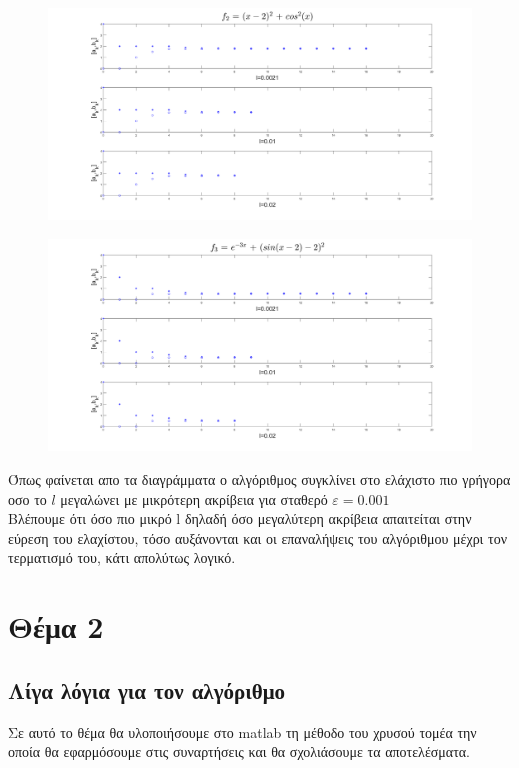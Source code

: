 \documentclass{article}
\begin{document}
\begin{figure}[h!]	
     \centering
     \advance\leftskip-2.45cm 
  \includegraphics[width=160mm,scale=2]{t3b.png}
\end{figure}
\clearpage
\begin{figure}[h!]	
     \centering
     \advance\leftskip-2.45cm 
  \includegraphics[width=170mm,scale=2]{t3c.png}
\end{figure}
Όπως φαίνεται απο τα διαγράμματα ο αλγόριθμος συγκλίνει στο ελάχιστο πιο γρήγορα οσο το $l$ μεγαλώνει με μικρότερη ακρίβεια για σταθερό $ε=0.001$ \\ 
Βλέπουμε ότι όσο πιο μικρό l δηλαδή όσο μεγαλύτερη ακρίβεια απαιτείται στην εύρεση του
ελαχίστου, τόσο αυξάνονται και οι επαναλήψεις του αλγόριθμου μέχρι τον τερματισμό του, κάτι
απολύτως λογικό.
\newpage
\section*{Θέμα 2}
\subsection*{Λίγα λόγια για τον αλγόριθμο} 
Σε αυτό το θέμα θα υλοποιήσουμε στο matlab τη μέθοδο του χρυσού τομέα την οποία θα εφαρμόσουμε στις συναρτήσεις και θα σχολιάσουμε τα αποτελέσματα.
\end{document}
